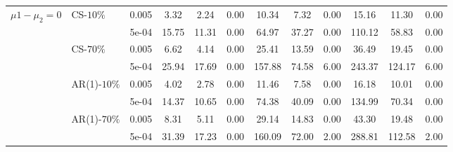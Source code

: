 \documentclass[11pt,a5paper,twoside]{book}
\begin{document}
{{\begin{table}[ht]
{\begin{tabular}{clcccccccccc}
\multirow{8}{*}{$\mu1-\mu_2=0$} &\multirow{2}{*}{CS-$10\%$}    &0.005 & 3.32 & 2.24 & 0.00 & 10.34 & 7.32 & 0.00 & 15.16 & 11.30 & 0.00 \\ 
  &&5e-04 & 15.75 & 11.31 & 0.00 & 64.97 & 37.27 & 0.00 & 110.12 & 58.83 & 0.00 \\ 
 &\multirow{2}{*}{CS-$70\%$}  &0.005 & 6.62 & 4.14 & 0.00 & 25.41 & 13.59 & 0.00 & 36.49 & 19.45 & 0.00 \\ 
  &&5e-04 & 25.94 & 17.69 & 0.00 & 157.88 & 74.58 & 6.00 & 243.37 & 124.17 & 6.00 \\ 
  &\multirow{2}{*}{AR(1)-$10\%$}  &0.005 & 4.02 & 2.78 & 0.00 & 11.46 & 7.58 & 0.00 & 16.18 & 10.01 & 0.00 \\ 
 & &5e-04 & 14.37 & 10.65 & 0.00 & 74.38 & 40.09 & 0.00 & 134.99 & 70.34 & 0.00 \\ 
   &\multirow{2}{*}{AR(1)-$70\%$}&0.005 & 8.31 & 5.11 & 0.00 & 29.14 & 14.83 & 0.00 & 43.30 & 19.48 & 0.00 \\ 
 & &5e-04 & 31.39 & 17.23 & 0.00 & 160.09 & 72.00 & 2.00 & 288.81 & 112.58 & 2.00 \\ 
	\end{tabular}}
\end{table}


}}
\end{document}
